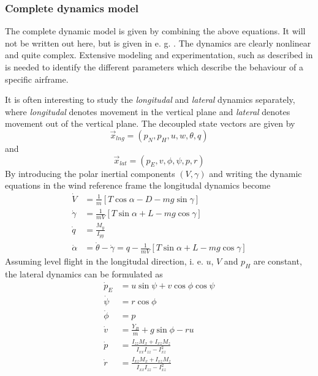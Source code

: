\subsubsection{Complete dynamics model}
The complete dynamic model is given by combining the above equations. It will not be 
written out here, but is given in e. g. \cite{uav_dynamics_wind}. The dynamics are clearly nonlinear and quite complex. Extensive modeling and experimentation, such as described in \cite{aerodynamic_parameters}
is needed to identify the different parameters which describe the behaviour of a specific airframe.

It is often interesting to study the \textit{longitudal} and \textit{lateral} dynamics
separately, where \textit{longitudal} denotes movement in the vertical plane and
\textit{lateral} denotes movement out of the vertical plane. The decoupled state
vectors are given by
\begin{equation}
    \vec{x}_{lng}=(p_N, p_H, u, w, \theta, q)
\end{equation}
and
\begin{equation}
    \vec{x}_{lat}=(p_E, v, \phi, \psi, p, r)
\end{equation}
By introducing the polar inertial components $(V, \gamma)$ and writing the dynamic equations
in the wind reference frame the longitudal dynamics become
\begin{align}
    \dot{V}&=\frac{1}{m}[T\cos\alpha-D-mg\sin\gamma] \\
    \dot{\gamma}&=\frac{1}{mV}[T\sin\alpha + L - mg\cos\gamma] \\
    \dot{q}&=\frac{M_y}{I_{yy}} \\
    \dot{\alpha}&=\dot{\theta}-\dot{\gamma}=q-\frac{1}{mV}[T\sin\alpha + L - mg\cos\gamma]
\end{align}
Assuming level flight in the longitudal direction, i. e. $u$, $V$ and $p_H$ are constant, the lateral dynamics can be formulated as
\begin{align}
    \dot{p}_E &= u\sin\psi + v\cos\phi\cos\psi \\
    \dot{\psi} &= r\cos\phi \\
    \dot{\phi} &= p \\
    \dot{v} &= \frac{Y_B}{m} + g\sin\phi - ru \\
    \dot{p} &= \frac{I_{zz}M_x + I_{xz}M_z}{I_{xx}I_{zz} - I^2_{xz}} \\
    \dot{r} &= \frac{I_{xz}M_x + I_{xz}M_z}{I_{xx}I_{zz} - I^2_{xz}} \\
\end{align}